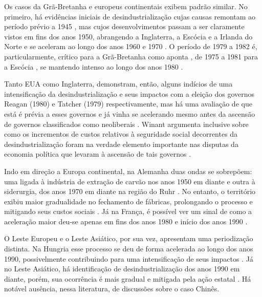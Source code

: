 Os casos da Grã-Bretanha e europeus continentais exibem padrão
similar. No primeiro, há evidências iniciais de desindustrialização
cujas causas remontam ao período prévio a 1945
\citep{tomlinson_-industrialization_2020}, mas cujos desenvolvimentos passam a ser claramente vistos em
fins dos anos 1950, abrangendo a Inglaterra, a Escócia e a Irlanda do
Norte e se aceleram ao longo dos anos 1960 e 1970
\citep{hodson_titanic_2019,phillips_closure_2015,tomlinson_-industrialization_2016}. O período de 1979 a 1982 é,
particularmente, crítico para a Grã-Bretanha como aponta \citet[p.~87]{tomlinson_-industrialization_2016}, de
1975 a 1981 para a Escócia
\citep{phillips_deindustrialization_2019}, se mantendo intenso ao longo dos anos 1980
\citep[p.~2]{beatty_long_2020}.

Tanto EUA como Inglaterra, demonstram, então, alguns indícios de uma
intensificação da desindustrialização e seus impactos com a eleição dos
governos Reagan (1980) e Tatcher (1979) respectivamente, mas há uma
avaliação de que está é prévia a esses governos e já vinha se acelerando
mesmo antes da ascensão de governos classificados como neoliberais
\citep{tomlinson_-industrialization_2016}. Winant argumenta inclusive sobre como os incrementos de
custos relativos à seguridade social decorrentes da desindustrialização
foram na verdade elemento importante nas disputas da economia política
que levaram à ascensão de tais governos
\citep[p.~113--114]{winant_hard_2019}.

Indo em direção a Europa continental, na Alemanha duas ondas se
sobrepõem: uma ligada à indústria de extração de carvão nos anos 1950 em
diante e outra à siderurgia, dos anos 1970 em diante na região do Ruhr
\citep{berger_burdens_2017}. No entanto, o território exibiu maior gradualidade
no fechamento de fábricas, prolongando o processo e mitigando seus
custos sociais
\citep{berger_burdens_2017}. Já na França, é possível ver um sinal de como a
aceleração maior deu-se apenas em fins dos anos 1980 e início dos anos
1990 \citep{clarke_closing_2015}.

O Leste Europeu e o Leste Asiático, por sua vez, apresentam uma
periodização distinta. Na Hungria esse processo se deu de forma
acelerada ao longo dos anos 1990, possivelmente contribuindo para uma
intensificação de seus impactos
\citep{scheiring_left_2020,scheiring_deindustrialization_2023}. Já no Leste Asiático, há identificação de
desindustrialização dos anos 1990 em diante, porém, sua ocorrência é
mais gradual e mitigada pela ação estatal
\citep{lee_institutional_2016}. Há
notável ausência, nessa literatura, de discussões sobre o caso Chinês.

